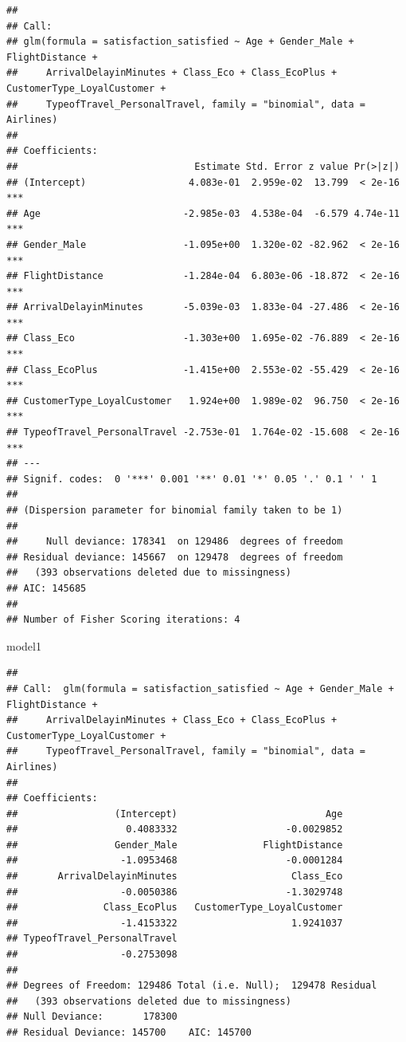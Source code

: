\documentclass[
]{article}
\newenvironment{Shaded}{\begin{snugshade}}{\end{snugshade}}
\newcommand{\NormalTok}[1]{#1}
\begin{document}
\begin{verbatim}
## 
## Call:
## glm(formula = satisfaction_satisfied ~ Age + Gender_Male + FlightDistance + 
##     ArrivalDelayinMinutes + Class_Eco + Class_EcoPlus + CustomerType_LoyalCustomer + 
##     TypeofTravel_PersonalTravel, family = "binomial", data = Airlines)
## 
## Coefficients:
##                               Estimate Std. Error z value Pr(>|z|)    
## (Intercept)                  4.083e-01  2.959e-02  13.799  < 2e-16 ***
## Age                         -2.985e-03  4.538e-04  -6.579 4.74e-11 ***
## Gender_Male                 -1.095e+00  1.320e-02 -82.962  < 2e-16 ***
## FlightDistance              -1.284e-04  6.803e-06 -18.872  < 2e-16 ***
## ArrivalDelayinMinutes       -5.039e-03  1.833e-04 -27.486  < 2e-16 ***
## Class_Eco                   -1.303e+00  1.695e-02 -76.889  < 2e-16 ***
## Class_EcoPlus               -1.415e+00  2.553e-02 -55.429  < 2e-16 ***
## CustomerType_LoyalCustomer   1.924e+00  1.989e-02  96.750  < 2e-16 ***
## TypeofTravel_PersonalTravel -2.753e-01  1.764e-02 -15.608  < 2e-16 ***
## ---
## Signif. codes:  0 '***' 0.001 '**' 0.01 '*' 0.05 '.' 0.1 ' ' 1
## 
## (Dispersion parameter for binomial family taken to be 1)
## 
##     Null deviance: 178341  on 129486  degrees of freedom
## Residual deviance: 145667  on 129478  degrees of freedom
##   (393 observations deleted due to missingness)
## AIC: 145685
## 
## Number of Fisher Scoring iterations: 4
\end{verbatim}

\begin{Shaded}
\begin{Highlighting}[]
\NormalTok{model1}
\end{Highlighting}
\end{Shaded}

\begin{verbatim}
## 
## Call:  glm(formula = satisfaction_satisfied ~ Age + Gender_Male + FlightDistance + 
##     ArrivalDelayinMinutes + Class_Eco + Class_EcoPlus + CustomerType_LoyalCustomer + 
##     TypeofTravel_PersonalTravel, family = "binomial", data = Airlines)
## 
## Coefficients:
##                 (Intercept)                          Age  
##                   0.4083332                   -0.0029852  
##                 Gender_Male               FlightDistance  
##                  -1.0953468                   -0.0001284  
##       ArrivalDelayinMinutes                    Class_Eco  
##                  -0.0050386                   -1.3029748  
##               Class_EcoPlus   CustomerType_LoyalCustomer  
##                  -1.4153322                    1.9241037  
## TypeofTravel_PersonalTravel  
##                  -0.2753098  
## 
## Degrees of Freedom: 129486 Total (i.e. Null);  129478 Residual
##   (393 observations deleted due to missingness)
## Null Deviance:       178300 
## Residual Deviance: 145700    AIC: 145700
\end{verbatim}
\end{document}
